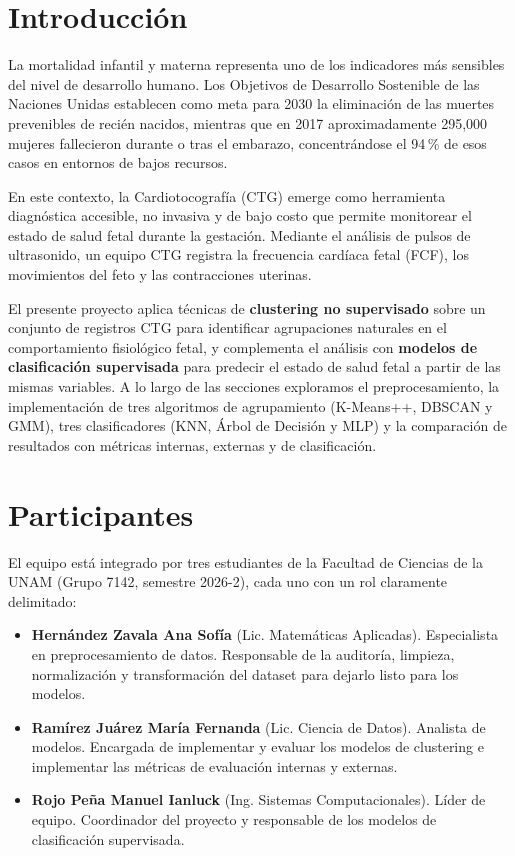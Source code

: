 \documentclass[12pt,letterpaper]{article}
\begin{document}


\newpage
\tableofcontents
\newpage

\section{Introducción}

La mortalidad infantil y materna representa uno de los indicadores más sensibles del nivel de
desarrollo humano. Los Objetivos de Desarrollo Sostenible de las Naciones Unidas establecen
como meta para 2030 la eliminación de las muertes prevenibles de recién nacidos, mientras que
en 2017 aproximadamente 295{,}000 mujeres fallecieron durante o tras el embarazo,
concentrándose el 94\,\% de esos casos en entornos de bajos recursos.

En este contexto, la Cardiotocografía (CTG) emerge como herramienta diagnóstica accesible,
no invasiva y de bajo costo que permite monitorear el estado de salud fetal durante la gestación.
Mediante el análisis de pulsos de ultrasonido, un equipo CTG registra la frecuencia cardíaca
fetal (FCF), los movimientos del feto y las contracciones uterinas.

El presente proyecto aplica técnicas de \textbf{clustering no supervisado} sobre un conjunto de
registros CTG para identificar agrupaciones naturales en el comportamiento fisiológico fetal,
y complementa el análisis con \textbf{modelos de clasificación supervisada} para predecir el
estado de salud fetal a partir de las mismas variables. A lo largo de las secciones exploramos
el preprocesamiento, la implementación de tres algoritmos de agrupamiento (K-Means++,
DBSCAN y GMM), tres clasificadores (KNN, Árbol de Decisión y MLP) y la comparación de
resultados con métricas internas, externas y de clasificación.

\section{Participantes}

El equipo está integrado por tres estudiantes de la Facultad de Ciencias de la UNAM
(Grupo 7142, semestre 2026-2), cada uno con un rol claramente delimitado:

\begin{itemize}[leftmargin=1.8cm]
  \item \textbf{Hernández Zavala Ana Sofía} (Lic. Matemáticas Aplicadas). Especialista en preprocesamiento de datos. Responsable de la auditoría, limpieza, normalización y transformación del dataset para dejarlo listo para los modelos.
  \item \textbf{Ramírez Juárez María Fernanda} (Lic. Ciencia de Datos). Analista de modelos. Encargada de implementar y evaluar los modelos de clustering e implementar las métricas de evaluación internas y externas.
  \item \textbf{Rojo Peña Manuel Ianluck} (Ing. Sistemas Computacionales). Líder de equipo. Coordinador del proyecto y responsable de los modelos de clasificación supervisada.
\end{itemize}
\end{document}
